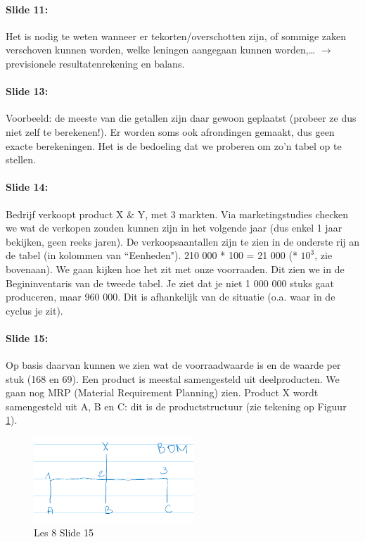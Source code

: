 \documentclass[10pt,a4paper]{report}
\begin{document}
\paragraph{Slide 11:} Het is nodig te weten wanneer er tekorten/overschotten zijn, of sommige zaken verschoven kunnen worden, welke leningen aangegaan kunnen worden,… $\rightarrow$ previsionele resultatenrekening en balans.

\paragraph{Slide 13:} Voorbeeld: de meeste van die getallen zijn daar gewoon geplaatst (probeer ze dus niet zelf te berekenen!). Er worden soms ook afrondingen gemaakt, dus geen exacte berekeningen. Het is de bedoeling dat we proberen om zo'n tabel op te stellen. 

\paragraph{Slide 14:} Bedrijf verkoopt product X $\&$ Y, met 3 markten. Via marketingstudies checken we wat de verkopen zouden kunnen zijn in het volgende jaar (dus enkel 1 jaar bekijken, geen reeks jaren). De verkoopsaantallen zijn te zien in de onderste rij an de tabel (in kolommen van ``Eenheden"). 210 000 * 100 = 21 000 (* $10^{3}$, zie bovenaan). We gaan kijken hoe het zit met onze voorraaden. Dit zien we in de Begininventaris van de tweede tabel. Je ziet dat je niet 1 000 000 stuks gaat produceren, maar 960 000. Dit is afhankelijk van de situatie (o.a. waar in de cyclus je zit).

\paragraph{Slide 15:} Op basis daarvan kunnen we zien wat de voorraadwaarde is en de waarde per stuk (168 en 69). Een product is meestal samengesteld uit deelproducten. We gaan nog MRP (Material Requirement Planning) zien. Product X wordt samengesteld uit A, B en C: dit is de productstructuur (zie tekening op Figuur \ref{les08_02}).

\begin{figure}[h!]
\centering
\includegraphics[width=60mm]{Les08_02.png}
\caption{Les 8 Slide 15} 
\label{les08_02}
\end{figure}
\end{document}
